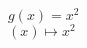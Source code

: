 \documentclass[varwidth,convert={density=2000,size=2000x,outext=.png}]{standalone}
\begin{document}
$g(x)=x^2$
\\
$(x)\mapsto x^2$
\end{document}
